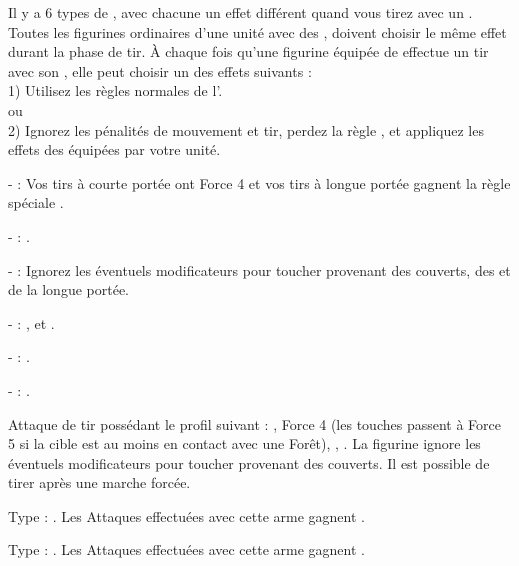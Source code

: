 \vspace*{1.5cm}
\startarmyarmoury

\startitemlistonecol

\listitemonecol{\feyarrows} Il y a 6 types de \feyarrows{}, avec chacune un effet différent quand vous tirez avec un \longbow{}. Toutes les figurines ordinaires d'une unité avec des \feyarrows{}, doivent choisir le même effet durant la phase de tir. À chaque fois qu'une figurine équipée de \feyarrows{} effectue un tir avec son \longbow{}, elle peut choisir un des effets suivants :\\
1) Utilisez les règles normales de l'\longbow{}.\\
ou\\
2) Ignorez les pénalités de mouvement et tir, perdez la règle \volleyfire{}, et appliquez les effets des \feyarrows{} équipées par votre unité.\\

	\begin{customsubitemize}
	\item[-] \textbf{\blackarrow{}} : Vos tirs à courte portée ont Force 4 et vos tirs à longue portée gagnent la règle spéciale .
	\item[-] \textbf{\hawthornpoint{}} : \poisonedattacks.
	\item[-] \textbf{\truemarkarrow{}} : Ignorez les éventuels modificateurs pour toucher provenant des couverts, des \skirmishers{} et de la longue portée.
	\item[-] \textbf{\starlightshaft{}} : \divineattacks{}, \flamingattacks{} et \magicalattacks{}.
	\item[-] \textbf{\perforatingtip{}} : .
	\item[-] \textbf{\jewelweedshot{}} : .
	\end{customsubitemize}

\listitemonecol{\impalingroots} Attaque de tir possédant le profil suivant : , Force 4 (les touches passent à Force 5 si la cible est au moins en contact avec une Forêt), , \quicktofire{}. La figurine ignore les éventuels modificateurs pour toucher provenant des couverts. Il est possible de tirer après une marche forcée.

\listitemonecol{\sylvanlance} Type : \lightlance. Les Attaques effectuées avec cette arme gagnent .

\listitemonecol{\sylvanblades} Type : \pw. Les Attaques effectuées avec cette arme gagnent .

